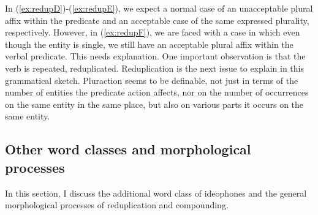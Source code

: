 \ea \label{ex:redup} 
\z\z



In (\ref{ex:redupD})-(\ref{ex:redupE}), we expect a normal case of an unacceptable plural affix within the predicate and
an acceptable case of the same expressed plurality, respectively. However, in (\ref{ex:redupF}), we are
faced with a case in which even though the entity is single, we still have an acceptable plural
affix within the verbal predicate. This needs explanation. 
One important observation is that
the verb is repeated, reduplicated. Reduplication is the next issue to explain in this
grammatical sketch. 
Pluraction seems to be definable, not just in terms of the number of
entities the predicate action affects, nor on the number of occurrences on the same entity in
the same place, but also on various parts it occurs on the same entity.



\subsection{Other word classes and morphological processes}
In this section, I discuss the additional word class of ideophones and the  general morphological processes of 
reduplication and compounding.


